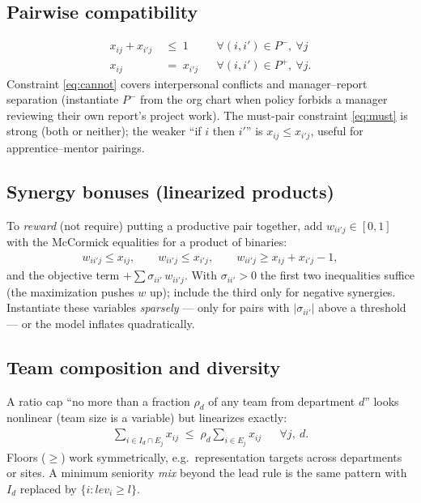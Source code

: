 \documentclass[11pt]{article}
\theoremstyle{remark}
\begin{document}
\subsection{Pairwise compatibility}
\begin{align}
x_{ij} + x_{i'j} &\;\le\; 1
  && \forall (i,i') \in P^{-},\ \forall j
  \label{eq:cannot} \\
x_{ij} &\;=\; x_{i'j}
  && \forall (i,i') \in P^{+},\ \forall j.
  \label{eq:must}
\end{align}
Constraint \eqref{eq:cannot} covers interpersonal conflicts and
manager--report separation (instantiate $P^{-}$ from the org chart when
policy forbids a manager reviewing their own report's project work). The
must-pair constraint \eqref{eq:must} is strong (both or neither); the
weaker ``if $i$ then $i'$'' is $x_{ij} \le x_{i'j}$, useful for
apprentice--mentor pairings.

\subsection{Synergy bonuses (linearized products)}
To \emph{reward} (not require) putting a productive pair together, add
$w_{i i' j} \in [0,1]$ with the McCormick equalities for a product of
binaries:
\begin{align}
w_{i i' j} \le x_{ij}, \qquad
w_{i i' j} \le x_{i'j}, \qquad
w_{i i' j} \ge x_{ij} + x_{i'j} - 1,
\label{eq:mccormick}
\end{align}
and the objective term $+\sum \sigma_{i i'}\, w_{i i' j}$. With
$\sigma_{i i'} > 0$ the first two inequalities suffice (the maximization
pushes $w$ up); include the third only for negative synergies. Instantiate
these variables \emph{sparsely} --- only for pairs with
$|\sigma_{i i'}|$ above a threshold --- or the model inflates
quadratically.

\subsection{Team composition and diversity}
A ratio cap ``no more than a fraction $\rho_d$ of any team from department
$d$'' looks nonlinear (team size is a variable) but linearizes exactly:
\begin{align}
\sum_{i \in I_d \cap E_j} x_{ij}
  \;\le\; \rho_d \sum_{i \in E_j} x_{ij}
  && \forall j,\ d.
  \label{eq:diversity}
\end{align}
Floors ($\ge$) work symmetrically, e.g.\ representation targets across
departments or sites. A minimum seniority \emph{mix} beyond the lead rule
is the same pattern with $I_d$ replaced by $\{i : \mathit{lev}_i \ge l\}$.
\end{document}
